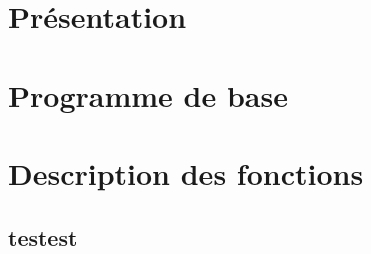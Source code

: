 \documentclass{book}
\begin{document}
\chapter{Présentation}
\chapter{Programme de base}
\chapter{Description des fonctions}
\section{testest}
\end{document}

